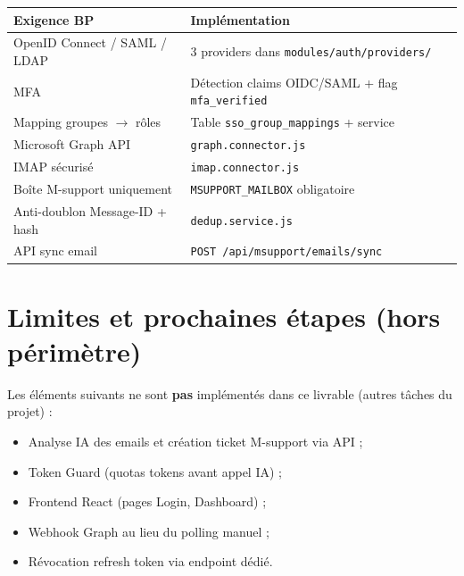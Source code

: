 \documentclass[12pt,a4paper]{article}
\begin{document}
\begin{tabular}{@{}ll@{}}
\toprule
Exigence BP & Implémentation \\
\midrule
OpenID Connect / SAML / LDAP & 3 providers dans \texttt{modules/auth/providers/} \\
MFA & Détection claims OIDC/SAML + flag \texttt{mfa\_verified} \\
Mapping groupes $\rightarrow$ rôles & Table \texttt{sso\_group\_mappings} + service \\
Microsoft Graph API & \texttt{graph.connector.js} \\
IMAP sécurisé & \texttt{imap.connector.js} \\
Boîte M-support uniquement & \texttt{MSUPPORT\_MAILBOX} obligatoire \\
Anti-doublon Message-ID + hash & \texttt{dedup.service.js} \\
API sync email & \texttt{POST /api/msupport/emails/sync} \\
\bottomrule
\end{tabular}

\section{Limites et prochaines étapes (hors périmètre)}

Les éléments suivants ne sont \textbf{pas} implémentés dans ce livrable (autres tâches du projet) :
\begin{itemize}
  \item Analyse IA des emails et création ticket M-support via API ;
  \item Token Guard (quotas tokens avant appel IA) ;
  \item Frontend React (pages Login, Dashboard) ;
  \item Webhook Graph au lieu du polling manuel ;
  \item Révocation refresh token via endpoint dédié.
\end{itemize}
\end{document}
